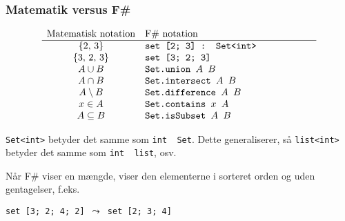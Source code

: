\documentclass{beamer}
\begin{document}
\begin{frame}
\frametitle{Matematik versus F\#}

\[\begin{array}{c@{\quad}p{0.5\textwidth}}
\textrm{Matematisk notation} & F\#{} notation \\\hline
\{2,\,3\} & \texttt{set [2; 3] : Set<int> }\\
 \{3,\,2,\,3\} & \texttt{set [3; 2; 3]} \\
A \cup B & \texttt{Set.union $A$ $B$} \\
A \cap B &  \texttt{Set.intersect $A$ $B$} \\
A \setminus B &  \texttt{Set.difference $A$ $B$} \\
x \in A &  \texttt{Set.contains  $x$ $A$} \\
A \subseteq B & \texttt{Set.isSubset $A$ $B$}\\
\end{array}\]

\texttt{Set<int>} betyder det samme som \texttt{int\,\,Set}.
Dette generaliserer, så \texttt{list<int>} betyder det samme som
\texttt{int\,\,list}, osv.

\vspace{1ex}

Når F\#{} viser en mængde, viser den elementerne i sorteret orden og
uden gentagelser, f.eks.

\vspace{1ex}
\texttt{set [3; 2; 4; 2] $\leadsto$ set [2; 3; 4]}
\end{frame}
\end{document}

